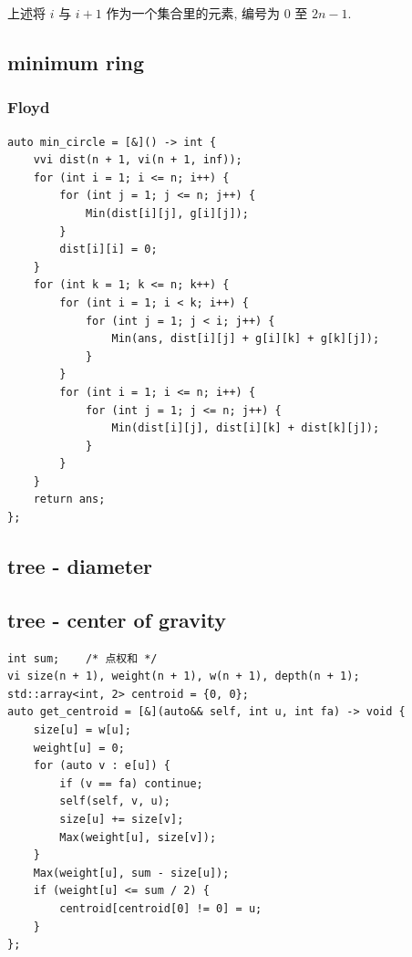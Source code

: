 \documentclass[UTF8, a4paper, titlepage, twoside]{ctexart}
\begin{document}
上述将 \(i\) 与 \(i + 1\) 作为一个集合里的元素, 编号为 \(0\) 至 \(2n - 1\).

\subsection{ minimum ring }
\subsubsection*{ Floyd }
\begin{lstlisting}[style=cpp]
auto min_circle = [&]() -> int {
    vvi dist(n + 1, vi(n + 1, inf));
    for (int i = 1; i <= n; i++) {
        for (int j = 1; j <= n; j++) {
            Min(dist[i][j], g[i][j]);
        }
        dist[i][i] = 0;
    }
    for (int k = 1; k <= n; k++) {
        for (int i = 1; i < k; i++) {
            for (int j = 1; j < i; j++) {
                Min(ans, dist[i][j] + g[i][k] + g[k][j]);
            }
        }
        for (int i = 1; i <= n; i++) {
            for (int j = 1; j <= n; j++) {
                Min(dist[i][j], dist[i][k] + dist[k][j]);
            }
        }
    }
    return ans;
};
\end{lstlisting}

\subsection*{ tree - diameter }

\subsection{ tree - center of gravity }
\begin{lstlisting}[style=cpp]
int sum;    /* 点权和 */
vi size(n + 1), weight(n + 1), w(n + 1), depth(n + 1);
std::array<int, 2> centroid = {0, 0};
auto get_centroid = [&](auto&& self, int u, int fa) -> void {
    size[u] = w[u];
    weight[u] = 0;
    for (auto v : e[u]) {
        if (v == fa) continue;
        self(self, v, u);
        size[u] += size[v];
        Max(weight[u], size[v]);
    }
    Max(weight[u], sum - size[u]);
    if (weight[u] <= sum / 2) {
        centroid[centroid[0] != 0] = u;
    }
};
\end{lstlisting}
\end{document}
